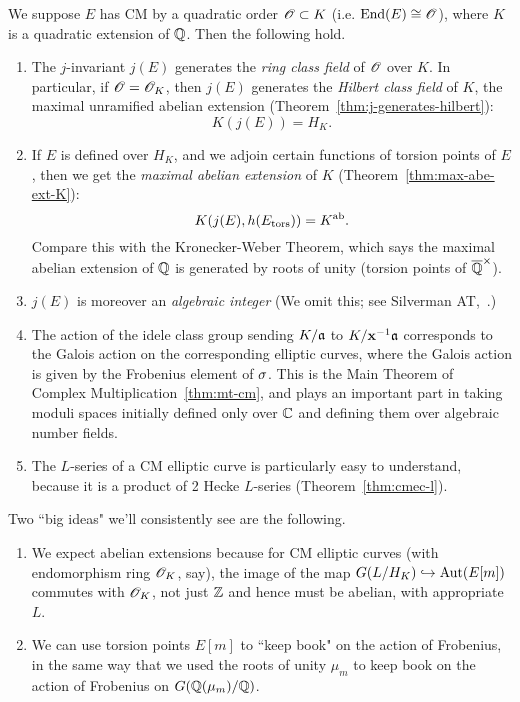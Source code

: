 We suppose $E$ has CM by a quadratic order $\mathscr{O}\subset K$ (i.e. $\operatorname{End}(E)\cong \mathscr{O}$), where $K$ is a quadratic extension of $\mathbb{Q}$. Then the following hold.
\begin{enumerate}
\item
The $j$-invariant $j(E)$ generates the {\it ring class field} of $\mathscr{O}$ over $K$. In particular, if $\mathscr{O}=\mathscr{O}_K$, then $j(E)$ generates the {\it Hilbert class field} of $K$, the maximal unramified abelian extension (Theorem~\ref{thm:j-generates-hilbert}):
\[
K(j(E))=H_K.
\]
\item
If $E$ is defined over $H_K$, and we adjoin certain functions of torsion points of $E$, then we get the {\it maximal abelian extension} of $K$ (Theorem~\ref{thm:max-abe-ext-K}):
\[
K(j(E),h(E_{\text{tors}}))=K^{\text{ab}}.
\]
Compare this with the Kronecker-Weber Theorem, which says the maximal abelian extension of $\mathbb{Q}$ is generated by roots of unity (torsion points of $\overline{\mathbb{Q}}^{\times}$).
\item
$j(E)$ is moreover an {\it algebraic integer} (We omit this; see Silverman AT,~\cite[II.6]{Si94}.) %
\item
The action of the idele class group sending $K/\mathfrak{a}$ to $K/\mathbf{x}^{-1}\mathfrak{a}$ corresponds to the Galois action on the corresponding elliptic curves, where the Galois action is given by the Frobenius element of $\sigma$. This is the Main Theorem of Complex Multiplication~\ref{thm:mt-cm}, and plays an important part in taking moduli spaces initially defined only over $\mathbb{C}$ and defining them over algebraic number fields.
\item
The $L$-series of a CM elliptic curve is particularly easy to understand, because it is a product of 2 Hecke $L$-series (Theorem~\ref{thm:cmec-l}). 
\end{enumerate}

Two ``big ideas" we'll consistently see are the following.
\begin{enumerate}
\item We expect abelian extensions because for CM elliptic curves (with endomorphism ring $\mathscr{O}_K$, say), the image of the map $G(L/H_K)\hookrightarrow \operatorname{Aut}(E[m])$ commutes with $\mathscr{O}_K$, not just $\mathbb{Z}$ and hence must be abelian, with appropriate $L$.
\item We can use torsion points $E[m]$ to ``keep book" on the action of Frobenius, in the same way that we used the roots of unity $\mu_m$ to keep book on the action of Frobenius on $G(\mathbb{Q}(\mu_m)/\mathbb{Q})$.
\end{enumerate}
